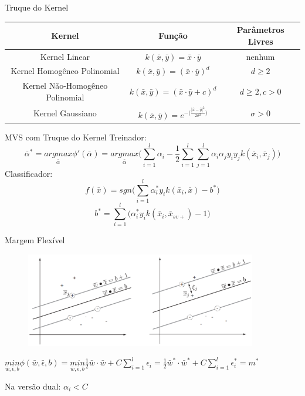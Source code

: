 \documentclass{beamer}
\begin{document}
\begin{frame}{Truque do Kernel}
\begin{table}
    \small
    \centering
    \begin{tabular}{|c|c|c|} \hline
            Kernel & Função & Parâmetros Livres \\ \hline
        Kernel Linear & $k(\bar{x},\bar{y})=\bar{x}\cdot\bar{y}$ & nenhum \\
        Kernel Homogêneo Polinomial & $k(\bar{x},\bar{y})=(\bar{x}\cdot\bar{y})^d$ & $d\ge2$ \\
        Kernel Não-Homogêneo Polinomial & $k(\bar{x},\bar{y})=(\bar{x}\cdot\bar{y}+c)^d$ & $d\ge2, c > 0$ \\
        Kernel Gaussiano & $k(\bar{x},\bar{y})=e^{-\big(\frac{|\bar{x}-\bar{y}|^2}{2\sigma^2}\big)}$ & $\sigma>0$ \\ \hline
    \end{tabular}
\end{table}
\end{frame}

\begin{frame}{MVS com Truque do Kernel}
Treinador:
\begin{equation}
    \bar{\alpha}^* = \underset{\bar{\alpha}}{argmax}{\phi}'(\bar{\alpha}) =\underset{\bar{\alpha}}{argmax} \Bigg( \sum_{i=1}^{l}\alpha_i - \frac{1}{2}\sum_{i=1}^{l}\sum_{j=1}^{l}\alpha_i \alpha_j y_i y_j k(\bar{x}_i,\bar{x}_j) \Bigg)
    \label{eq:EQ_Treinador_2}
\end{equation}
Classificador:
\begin{equation}
    f(\bar{x}) = sgn\Bigg(
        \sum_{i=1}^{l} \alpha_i^*y_i k(\bar{x}_i,\bar{x})
        -b^*
    \Bigg)
    \label{eq:EQ_Classificador_2}
\end{equation}
\begin{equation}
    b^* = \sum_{i=1}^{l}
    \Bigg(
        \alpha_i^*y_i k(\bar{x}_i,\bar{x}_{sv+})-1
    \Bigg)
    \label{eq:EQ_B_2}
\end{equation}
\end{frame}

\begin{frame}{Margem Flexível}
\begin{figure}
    \centering
    \includegraphics[width=0.9\textwidth]{svm_6.png}
\end{figure}
$\underset{\bar{w}, \bar{\epsilon}, b}{min}\phi(\bar{w}, \bar{\epsilon},b)
    = \underset{\bar{w}, \bar{\epsilon}, b}{min}\frac{1}{2}\bar{w}\cdot\bar{w} + C\sum_{i=1}^l \epsilon_i
    = \frac{1}{2}\bar{w}^*\cdot\bar{w}^* + C\sum_{i=1}^l \epsilon_i^*
    =m^*$
    
    Na versão dual: $\alpha_i<C$
\end{frame}
\end{document}
